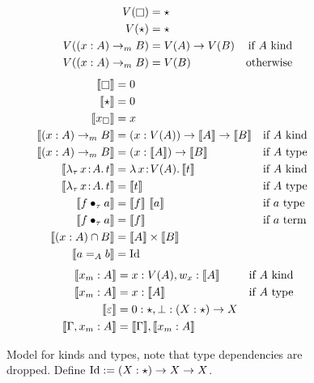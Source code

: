 
\begin{figure}
    \centering
    \begin{align*}
        V(\kind) &= \star \\
        V(\star) &= \star \\
        V((x : A) \to_m B) &= V(A) \to V(B) &\text{if} \text{ $A$ kind} \\
        V((x : A) \to_m B) &= V(B) &\text{otherwise}
    \end{align*}
    \begin{align*}
        \sema{\kind} &= 0 \\
        \sema{\star} &= 0 \\
        \sema{x_\square} &= x \\
        \sema{(x : A) \to_m B} &= (x : V(A)) \to \sema{A} \to \sema{B} &\text{if}& \text{ $A$ kind} \\
        \sema{(x : A) \to_m B} &= (x : \sema{A}) \to \sema{B} &\text{if}& \text{ $A$ type} \\
        \sema{\abs{\lambda_\tau}{x}{A}{t}} &= \abs{\lambda}{x}{V(A)}{\sema{t}} &\text{if}& \text{ $A$ kind} \\
        \sema{\abs{\lambda_\tau}{x}{A}{t}} &= \sema{t} &\text{if}& \text{ $A$ type} \\
        \sema{\app{f}{\tau}{a}} &= \sema{f}\ \sema{a} &\text{if}& \text{ $a$ type} \\
        \sema{\app{f}{\tau}{a}} &= \sema{f} &\text{if}& \text{ $a$ term} \\
        \sema{(x : A) \cap B} &= \sema{A} \times \sema{B} \\
        \sema{a =_A b} &= \fpId
    \end{align*}
    \begin{align*}
        \llbracket x_m : A \rrbracket &= x : V(A), w_x : \llbracket A \rrbracket &\text{if}& \text{ $A$ kind} \\
        \llbracket x_m : A \rrbracket &= x : \llbracket A \rrbracket &\text{if}& \text{ $A$ type} \\
        \llbracket \varepsilon \rrbracket &= 0 : \star, \bot : (X : \star) \to X \\
        \llbracket \Gamma, x_m : A \rrbracket &= \llbracket \Gamma \rrbracket, \llbracket x_m : A \rrbracket
    \end{align*}
    \caption{
        Model for kinds and types, note that type dependencies are dropped.
        Define $\textnormal{Id} := (X : \star) \to X \to X$.
    }
    \label{fig:3:model_types}
\end{figure}

